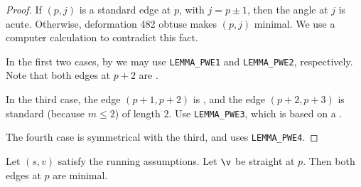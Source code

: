 \begin{proof}
If $(p,j)$ is a standard edge at $p$, with $j=p\pm 1$, then the angle at $j$ is acute. Otherwise,
deformation 482 obtuse makes $(p,j)$ minimal.  We use a computer calculation to contradict this fact.

In the first two cases, by 
we may use {\tt LEMMA\_PWE1} and {\tt LEMMA\_PWE2}, respectively.  Note that both edges at $p+2$
are \prop.

In the third case, the edge $(p+1,p+2)$ is \prop, and the edge $(p+2,p+3)$ is standard (because $m\le 2$)
of length $2$.  Use {\tt LEMMA\_PWE3}, which is based on a 
.

The fourth case is symmetrical with the third, and uses {\tt LEMMA\_PWE4}.
%
%
%
%
%
\end{proof}

\begin{lemma}[]  Let $(s,v)$ satisfy the running assumptions.  Let $\v$ be
straight at $p$.  Then both edges at $p$ are minimal.
\end{lemma}

